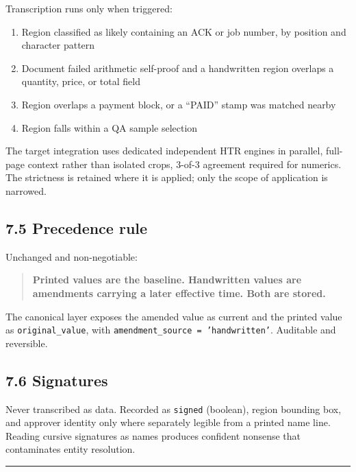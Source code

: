 \documentclass[
]{article}
\providecommand{\tightlist}{%
  \setlength{\itemsep}{0pt}\setlength{\parskip}{0pt}}
\begin{document}
Transcription runs only when triggered:

\begin{enumerate}
\def\labelenumi{\arabic{enumi}.}
\tightlist
\item
  Region classified as likely containing an ACK or job number, by
  position and character pattern
\item
  Document failed arithmetic self-proof and a handwritten region
  overlaps a quantity, price, or total field
\item
  Region overlaps a payment block, or a ``PAID'' stamp was matched
  nearby
\item
  Region falls within a QA sample selection
\end{enumerate}

The target integration uses dedicated independent HTR engines in
parallel, full-page context rather than isolated crops, 3-of-3 agreement
required for numerics. The strictness is retained where it is applied;
only the scope of application is narrowed.

\subsection{7.5 Precedence rule}\label{precedence-rule}

Unchanged and non-negotiable:

\begin{quote}
\textbf{Printed values are the baseline. Handwritten values are
amendments carrying a later effective time. Both are stored.}
\end{quote}

The canonical layer exposes the amended value as current and the printed
value as \texttt{original\_\allowbreak{}value}, with
\texttt{amendment\_\allowbreak{}source = 'handwritten'}. Auditable and
reversible.

\subsection{7.6 Signatures}\label{signatures}

Never transcribed as data. Recorded as \texttt{signed} (boolean), region
bounding box, and approver identity only where separately legible from a
printed name line. Reading cursive signatures as names produces
confident nonsense that contaminates entity resolution.

\begin{center}\rule{0.5\linewidth}{0.5pt}\end{center}
\end{document}

